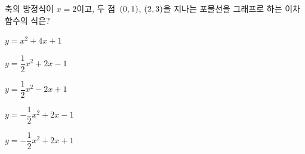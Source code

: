 축의 방정식이 $x=2$이고, 두 점~$(0{,}\mkern3mu 1)$, $(2{,}\mkern3mu 3)$을 지나는 포물선을 그래프로 하는 이차함수의 식은?
\begin{choicesii}{\rule[-3ex]{0pt}{8ex}$y=x^2+4x+1$}{\rule[-3ex]{0pt}{8ex}$y=\dfrac{1}{2}x^2+2x-1$}{\rule[-3ex]{0pt}{8ex}$y=\dfrac{1}{2}x^2-2x+1$}{\rule[-3ex]{0pt}{8ex}$y=-\dfrac{1}{2}x^2+2x-1$}{\rule[-3ex]{0pt}{8ex}$y=-\dfrac{1}{2}x^2+2x+1$}\end{choicesii}
